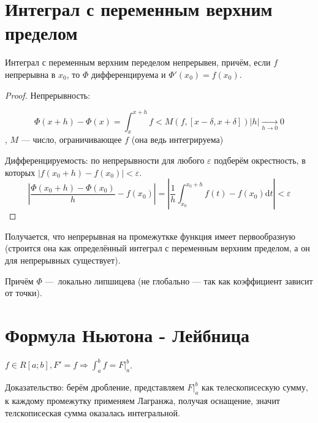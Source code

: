 \documentclass[12pt, a4paper]{article}
\begin{document}
\section{Интеграл с переменным верхним пределом}

    \begin{theorem}

        Интеграл с переменным верхним переделом непрерывен, причём, если $f$ непрерывна в $x_0$, то $\Phi$ дифференцируема и $\Phi'(x_0) = f(x_0)$.

        \begin{proof}
            Непрерывность: 

            \begin{equation}
                \Phi(x + h) - \Phi(x) = \int_x^{x + h} f < M(f, [x - \delta, x + \delta]) |h| \underset{h \to 0}{\longrightarrow} 0
            \end{equation}
            , $M$ — число, ограничивающее $f$ (она ведь интегрируема)
            
            Дифференцируемость: по непрерывности для любого $\varepsilon$ подберём окрестность, в которых $|f(x_0 + h) - f(x_0)| < \varepsilon$.
            \begin{equation}
                \left| \frac{\Phi(x_0 + h) - \Phi(x_0)}{h} - f(x_0) \right| = \left| \frac{1}{h} \int_{x_0}^{x_0 + h} f(t) - f(x_0) \mathrm{d}t \right| < \varepsilon
            \end{equation}
        \end{proof}
    \end{theorem}

    Получается, что непрерывная на промежуткке функция имеет первообразную (строится она как определённый интеграл с переменным верхним пределом, а он для непрерывных существует).

    Причём $\Phi$ — локально липшицева (не глобально — так как коэффициент зависит от точки).

\section{Формула Ньютона - Лейбница}

    $f \in R[a; b], F' = f \Rightarrow \int_a^b f = F|^b_a$.

    Доказательство: берём дробление, представляем $F|^b_a$ как телескописескую сумму, к каждому промежутку применяем Лагранжа, получая оснащение, значит телскописеская сумма оказалась интегральной.
\end{document}
